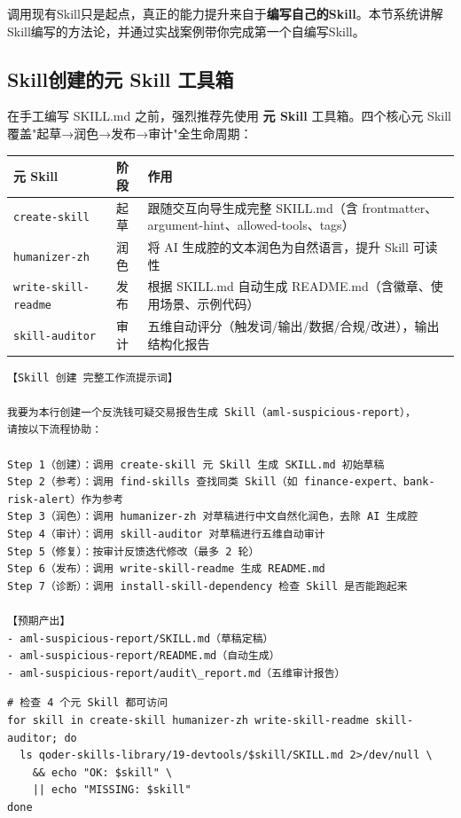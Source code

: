 调用现有Skill只是起点，真正的能力提升来自于\textbf{编写自己的Skill}。本节系统讲解Skill编写的方法论，并通过实战案例带你完成第一个自编写Skill。

\subsection{Skill创建的元 Skill 工具箱}

在手工编写 SKILL.md 之前，强烈推荐先使用 \textbf{元 Skill} 工具箱。四个核心元 Skill 覆盖"起草→润色→发布→审计"全生命周期：

\begin{table}[H]
\centering
\begin{tabular}{lp{4cm}p{6cm}}
\toprule
\textbf{元 Skill} & \textbf{阶段} & \textbf{作用} \\
\midrule
\texttt{create-skill} & 起草 & 跟随交互向导生成完整 SKILL.md（含 frontmatter、argument-hint、allowed-tools、tags） \\
\texttt{humanizer-zh} & 润色 & 将 AI 生成腔的文本润色为自然语言，提升 Skill 可读性 \\
\texttt{write-skill-readme} & 发布 & 根据 SKILL.md 自动生成 README.md（含徽章、使用场景、示例代码） \\
\texttt{skill-auditor} & 审计 & 五维自动评分（触发词/输出/数据/合规/改进），输出结构化报告 \\
\bottomrule
\end{tabular}
\end{table}

\begin{lstlisting}
【Skill 创建 完整工作流提示词】

我要为本行创建一个反洗钱可疑交易报告生成 Skill（aml-suspicious-report），
请按以下流程协助：

Step 1（创建）：调用 create-skill 元 Skill 生成 SKILL.md 初始草稿
Step 2（参考）：调用 find-skills 查找同类 Skill（如 finance-expert、bank-risk-alert）作为参考
Step 3（润色）：调用 humanizer-zh 对草稿进行中文自然化润色，去除 AI 生成腔
Step 4（审计）：调用 skill-auditor 对草稿进行五维自动审计
Step 5（修复）：按审计反馈迭代修改（最多 2 轮）
Step 6（发布）：调用 write-skill-readme 生成 README.md
Step 7（诊断）：调用 install-skill-dependency 检查 Skill 是否能跑起来

【预期产出】
- aml-suspicious-report/SKILL.md（草稿定稿）
- aml-suspicious-report/README.md（自动生成）
- aml-suspicious-report/audit\_report.md（五维审计报告）
\end{lstlisting}

\begin{notebox}
\begin{lstlisting}[style=shell]
# 检查 4 个元 Skill 都可访问
for skill in create-skill humanizer-zh write-skill-readme skill-auditor; do
  ls qoder-skills-library/19-devtools/$skill/SKILL.md 2>/dev/null \
    && echo "OK: $skill" \
    || echo "MISSING: $skill"
done
\end{lstlisting}
\end{notebox}

